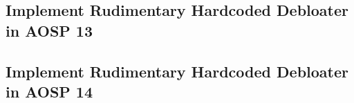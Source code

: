 \subsection{Implement Rudimentary Hardcoded Debloater in AOSP 13}

\subsection{Implement Rudimentary Hardcoded Debloater in AOSP 14}


% 











